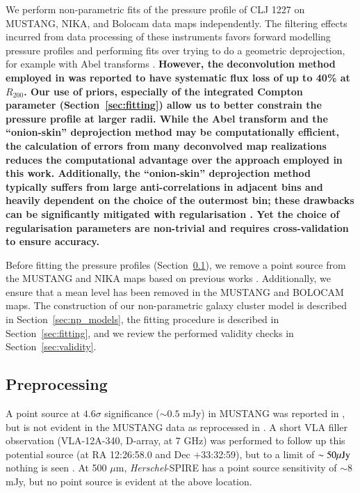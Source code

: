 \documentclass[twocolumn,traditabstract]{aa}
\begin{document}
We perform non-parametric fits of the pressure profile of CLJ 1227 on MUSTANG, NIKA, and Bolocam data maps independently.
The filtering effects incurred from data processing of these instruments favors forward modelling pressure profiles and
performing fits over trying to do a geometric deprojection, for example with Abel transforms \citep[e.g.][]{basu2010}.
\textbf{However, the deconvolution method employed in \citet{basu2010} was reported to have systematic flux loss of up to 40\%
at $R_{200}$. Our use of priors, especially of the integrated Compton parameter (Section~\ref{sec:fitting}) allow us to
better constrain the pressure profile at larger radii. While the Abel transform and the ``onion-skin'' deprojection method
\citep[e.g.][]{kriss1983} may be computationally efficient, the calculation of errors from many deconvolved map realizations
\citep[e.g. 100 as in ][]{david2001,basu2010} reduces the computational advantage over the approach employed in this work.
Additionally, the ``onion-skin'' deprojection method typically suffers from large anti-correlations in adjacent bins and heavily
dependent on the choice of the outermost bin; these drawbacks can be significantly mitigated with regularisation \citep[e.g.][]{croston2006}.
Yet the choice of regularisation parameters are non-trivial and requires cross-validation to ensure accuracy.}

Before fitting the pressure profiles (Section~\ref{sec:preprocessing}),
we remove a point source from the MUSTANG and NIKA maps based on previous works
\citep{adam2015,romero2017}. Additionally, we ensure that a mean level has been removed in the MUSTANG and BOLOCAM maps. 
The construction of our non-parametric galaxy cluster model is described in Section~\ref{sec:np_models}, the fitting
procedure is described in Section~\ref{sec:fitting}, and we review the performed validity checks in Section~\ref{sec:validity}.

\subsection{Preprocessing}
\label{sec:preprocessing}


A point source at $4.6\sigma$ significance ($\sim 0.5$ mJy) in MUSTANG was reported in \citet{korngut2011}, but is not
evident in the MUSTANG data as reprocessed in \citet{romero2017}. A short VLA filler observation (VLA-12A-340, D-array, at 7 GHz)
was performed to follow up this potential source (at RA 12:26:58.0 and Dec +33:32:59), but to a limit of $\sim 50 {\rm \mu Jy}$ nothing
is seen \citep{romero2017}. At 500 $\mu$m, \emph{Herschel}-SPIRE has a point source sensitivity of $\sim 8$ mJy, but no point
source is evident at the above location.
\end{document}
